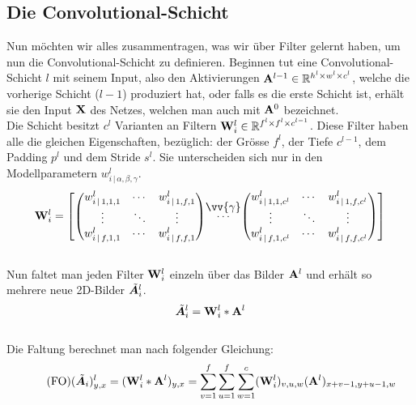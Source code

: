 \subsection{Die Convolutional-Schicht}
Nun möchten wir alles zusammentragen, was wir über Filter gelernt
haben, um nun die Convolutional-Schicht zu definieren.
\para{}
Beginnen tut eine Convolutional-Schicht $l$ mit seinem Input, also den
Aktivierungen $\mathbf{A}^{l-1} \in \mathbb{R}^{h^l \times w^l \times c^l}$, welche die vorherige Schicht ($l-1$) produziert hat,
oder falls es die erste Schicht ist, erhält sie den Input $\mathbf{X}$ des Netzes,
welchen man auch mit $\mathbf{A}^0$ bezeichnet. \\
Die Schicht besitzt $c^l$ Varianten an Filtern $\mathbf{W}^l_i \in
\mathbb{R}^{f^l \times f^l \times c^{l-1}}$. Diese Filter haben alle die gleichen
Eigenschaften, bezüglich: der Grösse $f^l$, der Tiefe $c^{l-1}$, dem Padding
$p^l$ und dem Stride $s^l$. Sie unterscheiden sich nur in den Modellparametern
$w^l_{i\,|\,\alpha,\beta,\gamma}$.
\\
\begin{equation*}
  \ten{W}^l_i =
  \begin{bmatrix}
    \begin{pmatrix}
      w_{i\,|\,1,1,1}^l & \cdots & w_{i\,|\,1,f,1}^l \\
      \vdots & \ddots & \vdots \\
      w_{i\,|\,f,1,1}^l & \cdots & w_{i\,|\,f,f,1}^l
    \end{pmatrix}
    & \stackrel{\mathclap{\normalfont\mbox{$\vv{\gamma}$}}}{\cdots} &
    \begin{pmatrix}
      w_{i\,|\,1,1,c^l}^l & \cdots & w_{i\,|\,1,f,c^l}^l \\
      \vdots & \ddots & \vdots \\
      w_{i\,|\,f,1,c^l}^l & \cdots & w_{i\,|\,f,f,c^l}^l
    \end{pmatrix}
  \end{bmatrix}
\end{equation*}
\\
Nun faltet man jeden Filter $\mathbf{W}_i^l$ einzeln über das Bilder
$\mathbf{A}^l$ und erhält so mehrere neue 2D-Bilder $\tilde{\bm{A}}_i^l$.
\\
\begin{equation}
  \tilde{\bm{A}}_i^l = \mathbf{W}_i^l * \mathbf{A}^l
\end{equation}
\\
Die Faltung berechnet man nach folgender Gleichung:
\\
\begin{equation}\tag{FO}
  (\tilde{\bm{A}}_i)_{y,x}^l = (\mathbf{W}_i^l * \mathbf{A}^l)_{y,x} = \sum_{v=1}^{f} \sum_{u=1}^{f} \sum_{w=1}^c (\mathbf{W}^l_i)_{v,u,w} (\mathbf{A}^l)_{x+v-1,y+u-1,w}
\end{equation}
